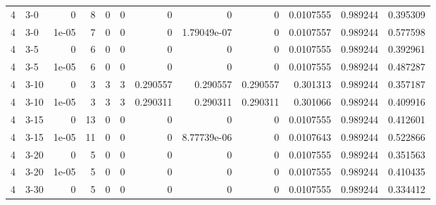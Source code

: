 \begin{tabular}{rlrrrrrrrrrr}
     4 & 3-0    &      0     &           8 &                 0 &                 0 &     0           &     0           &      0           &        0.0107555 &               0.989244 &           0.395309 \\
     4 & 3-0    &      1e-05 &           7 &                 0 &                 0 &     0           &     1.79049e-07 &      0           &        0.0107557 &               0.989244 &           0.577598 \\
     4 & 3-5    &      0     &           6 &                 0 &                 0 &     0           &     0           &      0           &        0.0107555 &               0.989244 &           0.392961 \\
     4 & 3-5    &      1e-05 &           6 &                 0 &                 0 &     0           &     0           &      0           &        0.0107555 &               0.989244 &           0.487287 \\
     4 & 3-10   &      0     &           3 &                 3 &                 3 &     0.290557    &     0.290557    &      0.290557    &        0.301313  &               0.989244 &           0.357187 \\
     4 & 3-10   &      1e-05 &           3 &                 3 &                 3 &     0.290311    &     0.290311    &      0.290311    &        0.301066  &               0.989244 &           0.409916 \\
     4 & 3-15   &      0     &          13 &                 0 &                 0 &     0           &     0           &      0           &        0.0107555 &               0.989244 &           0.412601 \\
     4 & 3-15   &      1e-05 &          11 &                 0 &                 0 &     0           &     8.77739e-06 &      0           &        0.0107643 &               0.989244 &           0.522866 \\
     4 & 3-20   &      0     &           5 &                 0 &                 0 &     0           &     0           &      0           &        0.0107555 &               0.989244 &           0.351563 \\
     4 & 3-20   &      1e-05 &           5 &                 0 &                 0 &     0           &     0           &      0           &        0.0107555 &               0.989244 &           0.410435 \\
     4 & 3-30   &      0     &           5 &                 0 &                 0 &     0           &     0           &      0           &        0.0107555 &               0.989244 &           0.334412 \\

\end{tabular}
